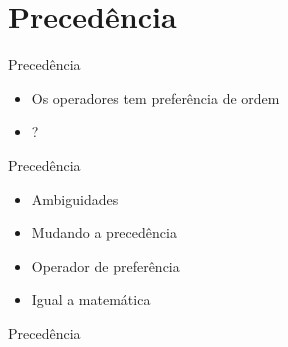 \documentclass[11pt]{beamer}
\begin{document}
\section{Precedência}
	\begin{frame}{Precedência}
		\begin{itemize}
			\presentationPause\item Os operadores tem preferência de ordem
			\presentationPause\item {} ?
		\end{itemize}
		\presentationPause
		\presentationPause
	\end{frame}\begin{frame}{Precedência}
		\begin{itemize}
			\presentationPause\item Ambiguidades
			\presentationPause\item Mudando a precedência
			\presentationPause\item Operador de preferência
			\presentationPause\item Igual a matemática
		\end{itemize}
	\end{frame}\begin{frame}{Precedência}
		\begin{table}[!h]
			\footnotesize\centering
			\caption{Ordem de precedência de operadores}
		

\end{table}
\end{frame}
\end{document}
